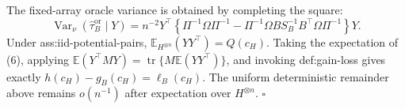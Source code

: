 The fixed-array oracle variance is obtained by completing the square:
\[
\operatorname{Var}_\nu(\widehat\tau_B^{\mathrm{or}}\mid Y)
=n^{-2}Y^{\top}
\left\{
\Pi^{-1}\Omega\Pi^{-1}
-\Pi^{-1}\Omega BS_B^{-1}B^{\top}\Omega\Pi^{-1}
\right\}Y. \tag{6}
\]
Under ass:iid-potential-pairs, \(\mathbb E_{H^{\otimes n}}(YY^{\top})=Q(c_H)\).  Taking the expectation of (6), applying \(\mathbb E(Y^{\top}MY)=\operatorname{tr}\{M\mathbb E(YY^{\top})\}\), and invoking def:gain-loss gives exactly \(h(c_H)-g_B(c_H)=\ell_B(c_H)\).  The uniform deterministic remainder above remains \(o(n^{-1})\) after expectation over \(H^{\otimes n}\). \(\square\)